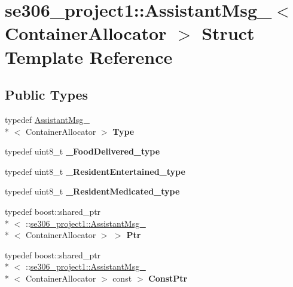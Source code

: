 \hypertarget{structse306__project1_1_1AssistantMsg__}{\section{se306\-\_\-project1\-:\-:Assistant\-Msg\-\_\-$<$ Container\-Allocator $>$ Struct Template Reference}
\label{structse306__project1_1_1AssistantMsg__}
}
\subsection*{Public Types}
\begin{DoxyCompactItemize}
\item 
\hypertarget{structse306__project1_1_1AssistantMsg___a1fd81595948c57178036f385b43b3e85}{typedef \hyperlink{structse306__project1_1_1AssistantMsg__}{Assistant\-Msg\-\_\-}\\*
$<$ Container\-Allocator $>$ {\bfseries Type}}\label{structse306__project1_1_1AssistantMsg___a1fd81595948c57178036f385b43b3e85}

\item 
\hypertarget{structse306__project1_1_1AssistantMsg___aab7f63a24f84feb2a092fe51c17dc539}{typedef uint8\-\_\-t {\bfseries \-\_\-\-Food\-Delivered\-\_\-type}}\label{structse306__project1_1_1AssistantMsg___aab7f63a24f84feb2a092fe51c17dc539}

\item 
\hypertarget{structse306__project1_1_1AssistantMsg___a55fa433676e20a64e98bf4787786e9bd}{typedef uint8\-\_\-t {\bfseries \-\_\-\-Resident\-Entertained\-\_\-type}}\label{structse306__project1_1_1AssistantMsg___a55fa433676e20a64e98bf4787786e9bd}

\item 
\hypertarget{structse306__project1_1_1AssistantMsg___a42d3bdf60fdba499ff744587a89ad936}{typedef uint8\-\_\-t {\bfseries \-\_\-\-Resident\-Medicated\-\_\-type}}\label{structse306__project1_1_1AssistantMsg___a42d3bdf60fdba499ff744587a89ad936}

\item 
\hypertarget{structse306__project1_1_1AssistantMsg___ae4e951cbe451656c3432adc85dac1d27}{typedef boost\-::shared\-\_\-ptr\\*
$<$ \-::\hyperlink{structse306__project1_1_1AssistantMsg__}{se306\-\_\-project1\-::\-Assistant\-Msg\-\_\-}\\*
$<$ Container\-Allocator $>$ $>$ {\bfseries Ptr}}\label{structse306__project1_1_1AssistantMsg___ae4e951cbe451656c3432adc85dac1d27}

\item 
\hypertarget{structse306__project1_1_1AssistantMsg___a96808a76b3826b3fe60f4733c576bb10}{typedef boost\-::shared\-\_\-ptr\\*
$<$ \-::\hyperlink{structse306__project1_1_1AssistantMsg__}{se306\-\_\-project1\-::\-Assistant\-Msg\-\_\-}\\*
$<$ Container\-Allocator $>$ const  $>$ {\bfseries Const\-Ptr}}\label{structse306__project1_1_1AssistantMsg___a96808a76b3826b3fe60f4733c576bb10}

\end{DoxyCompactItemize}

